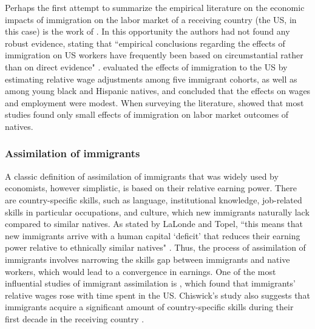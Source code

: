 Perhaps the first attempt to summarize the empirical literature on the economic impacts of immigration on the labor market of a receiving country (the US, in this case) is the work of \cite{greenwood_factor_1986}. In this opportunity the authors had not found any robust evidence, stating that ``empirical conclusions regarding the effects of immigration on US workers have frequently been based on circumstantial rather than on direct evidence" \citep[p. 1767]{greenwood_factor_1986}. \cite{lalonde_labor_1991} evaluated the effects of immigration to the US by estimating relative wage adjustments among five immigrant cohorts, as well as among young black and Hispanic natives, and concluded that the effects on wages and employment were modest. When surveying the literature, \cite{lalonde_economic_1997} showed that most studies found only small effects of immigration on labor market outcomes of natives.

\subsubsection{Assimilation of immigrants}

A classic definition of assimilation of immigrants that was widely used by economists, however simplistic, is based on their relative
earning power. There are country-specific skills, such as language, institutional knowledge, job-related skills in particular occupations, and culture, which new immigrants naturally lack compared to similar natives. As stated by LaLonde and Topel, ``this means that new immigrants arrive with a human capital `deficit' that reduces their earning power relative to ethnically similar natives" \citep[p. 828]{lalonde_economic_1997}. Thus, the process of assimilation of immigrants involves narrowing the skills gap  between immigrants and native workers, which would lead to a convergence in earnings. One of the most influential studies of immigrant assimilation is \cite{chiswick_effect_1978}, which found that immigrants' relative wages rose with time spent in the US. Chiswick's study also suggests that immigrants acquire a significant amount of country-specific skills during their first decade in the receiving country \citep{chiswick_effect_1978, lalonde_economic_1997}.